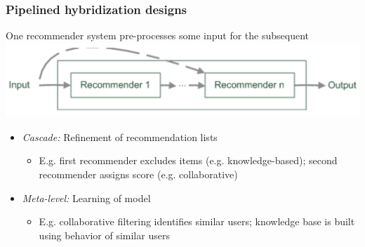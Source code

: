 \documentclass{beamer}
\begin{document}
\begin{frame}
    \frametitle{Pipelined hybridization designs}
    One recommender system pre-processes some input for the subsequent
    \includegraphics[width=\linewidth]{pipeline}
    \begin{itemize}
    \item \emph{Cascade:} Refinement of recommendation lists
        \begin{itemize}
        \item E.g. first recommender excludes items (e.g. knowledge-based);
            second recommender assigns score (e.g. collaborative)
        \end{itemize}
    \item \emph{Meta-level:} Learning of model
        \begin{itemize}
        \item E.g. collaborative filtering identifies similar users; knowledge
            base is built using behavior of similar users
        \end{itemize}
    \end{itemize}
\end{frame}
\end{document}
